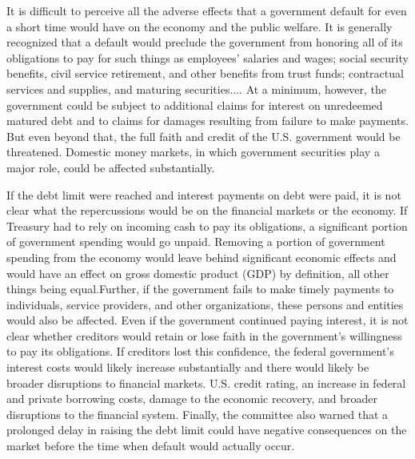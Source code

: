 \begin{displayquote}
It is difficult to perceive all the adverse effects that a government default for even a short time would have on the economy and the public welfare. It is generally recognized that a default would preclude the government from honoring all of its obligations to pay for such things as employees’ salaries and wages; social security benefits, civil service retirement, and other benefits from trust funds; contractual services and supplies, and maturing securities.... At a minimum, however, the government could be subject to additional claims for interest on unredeemed matured debt and to claims for damages resulting from failure to make payments. But even beyond that, the full faith and credit of the U.S. government would be threatened. Domestic money markets, in which government securities play a major role, could be affected substantially.
\end{displayquote}

If the debt limit were reached and interest payments on debt were paid, it is not clear what the repercussions would be on the financial markets or the economy. If Treasury had to rely on incoming cash to pay its obligations, a significant portion of government spending would go unpaid. Removing a portion of government spending from the economy would leave behind significant economic effects and would have an effect on gross domestic product (GDP) by definition, all other things being equal.Further, if the government fails to make timely payments to individuals, service providers, and other organizations, these persons and entities would also be affected. Even if the government continued paying interest, it is not clear whether creditors would retain or lose faith in the government’s willingness to pay its obligations. If creditors lost this confidence, the federal government’s interest costs would likely increase substantially and there would likely be broader disruptions to financial markets.
\nextline
U.S. credit rating, an increase in federal and private borrowing costs, damage to the economic recovery, and broader disruptions to the financial system. Finally, the committee also warned that a prolonged delay in raising the debt limit could have negative consequences on the market before the time when default would actually occur.
